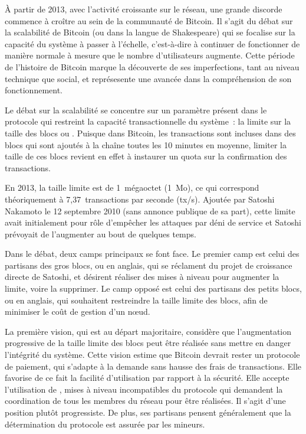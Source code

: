 À partir de 2013, avec l'activité croissante sur le réseau, une grande discorde commence à croître au sein de la communauté de Bitcoin. Il s'agit du débat sur la scalabilité de Bitcoin (ou  dans la langue de Shakespeare) qui se focalise sur la capacité du système à passer à l'échelle, c'est-à-dire à continuer de fonctionner de manière normale à mesure que le nombre d'utilisateurs augmente. Cette période de l'histoire de Bitcoin marque la découverte de ses imperfections, tant au niveau technique que social, et représesente une avancée dans la compréhension de son fonctionnement.

Le débat sur la scalabilité se concentre sur un paramètre présent dans le protocole qui restreint la capacité transactionnelle du système~: la limite sur la taille des blocs ou . Puisque dans Bitcoin, les transactions sont incluses dans des blocs qui sont ajoutés à la chaîne toutes les 10 minutes en moyenne, limiter la taille de ces blocs revient en effet à instaurer un quota sur la confirmation des transactions.

En 2013, la taille limite est de 1~mégaoctet (1~Mo), ce qui correspond théoriquement à 7,37~transactions par seconde (tx/s). Ajoutée par Satoshi Nakamoto le 12 septembre 2010 (sans annonce publique de sa part), cette limite avait initialement pour rôle d'empêcher les attaques par déni de service et Satoshi prévoyait de l'augmenter au bout de quelques temps.

Dans le débat, deux camps principaux se font face. Le premier camp est celui des partisans des gros blocs, ou  en anglais, qui se réclament du projet de croissance directe de Satoshi, et désirent réaliser des mises à niveau pour augmenter la limite, voire la supprimer. Le camp opposé est celui des partisans des petits blocs, ou  en anglais, qui souhaitent restreindre la taille limite des blocs, afin de minimiser le coût de gestion d'un nœud.

La première vision, qui est au départ majoritaire, considère que l'augmentation progressive de la taille limite des blocs peut être réalisée sans mettre en danger l'intégrité du système. Cette vision estime que Bitcoin devrait rester un protocole de paiement, qui s'adapte à la demande sans hausse des frais de transactions. Elle favorise de ce fait la facilité d'utilisation par rapport à la sécurité. Elle accepte l'utilisation de , mises à niveau incompatibles du protocole qui demandent la coordination de tous les membres du réseau pour être réalisées. Il s'agit d'une position plutôt progressiste. De plus, ses partisans pensent généralement que la détermination du protocole est assurée par les mineurs. %

